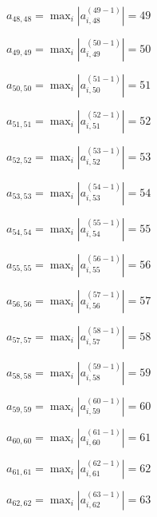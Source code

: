 \documentclass[a4paper,12pt]{article}
\begin{document}
$a _{ 48, 48 } =  \max _i |a _{ i, 48 } ^{ (49 - 1) } | = 49$

$a _{ 49, 49 } =  \max _i |a _{ i, 49 } ^{ (50 - 1) } | = 50$

$a _{ 50, 50 } =  \max _i |a _{ i, 50 } ^{ (51 - 1) } | = 51$

$a _{ 51, 51 } =  \max _i |a _{ i, 51 } ^{ (52 - 1) } | = 52$

$a _{ 52, 52 } =  \max _i |a _{ i, 52 } ^{ (53 - 1) } | = 53$

$a _{ 53, 53 } =  \max _i |a _{ i, 53 } ^{ (54 - 1) } | = 54$

$a _{ 54, 54 } =  \max _i |a _{ i, 54 } ^{ (55 - 1) } | = 55$

$a _{ 55, 55 } =  \max _i |a _{ i, 55 } ^{ (56 - 1) } | = 56$

$a _{ 56, 56 } =  \max _i |a _{ i, 56 } ^{ (57 - 1) } | = 57$

$a _{ 57, 57 } =  \max _i |a _{ i, 57 } ^{ (58 - 1) } | = 58$

$a _{ 58, 58 } =  \max _i |a _{ i, 58 } ^{ (59 - 1) } | = 59$

$a _{ 59, 59 } =  \max _i |a _{ i, 59 } ^{ (60 - 1) } | = 60$

$a _{ 60, 60 } =  \max _i |a _{ i, 60 } ^{ (61 - 1) } | = 61$

$a _{ 61, 61 } =  \max _i |a _{ i, 61 } ^{ (62 - 1) } | = 62$

$a _{ 62, 62 } =  \max _i |a _{ i, 62 } ^{ (63 - 1) } | = 63$
\end{document}
